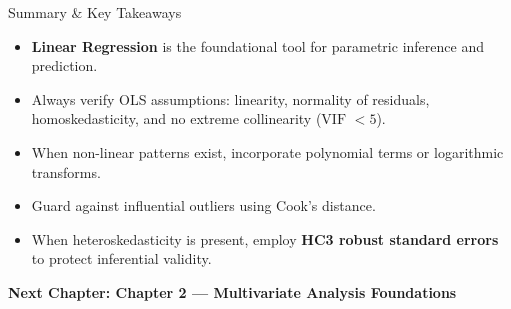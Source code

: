 \documentclass[aspectratio=169,ignorenonframetext]{beamer}
\begin{document}
\begin{frame}{Summary \& Key Takeaways}
\begin{itemize}
\item
  \textbf{Linear Regression} is the foundational tool for parametric
  inference and prediction.
\item
  Always verify OLS assumptions: linearity, normality of residuals,
  homoskedasticity, and no extreme collinearity (\(\text{VIF } < 5\)).
\item
  When non-linear patterns exist, incorporate polynomial terms or
  logarithmic transforms.
\item
  Guard against influential outliers using Cook's distance.
\item
  When heteroskedasticity is present, employ \textbf{HC3 robust standard
  errors} to protect inferential validity.
\end{itemize}

{ \textbf{Next Chapter: Chapter 2 --- Multivariate Analysis Foundations}
}
\end{frame}
\end{document}
